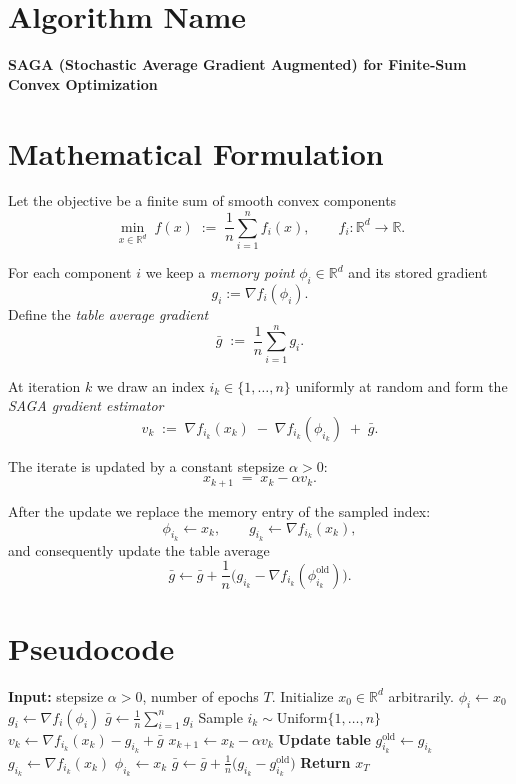 \documentclass{article}
\newcommand{\grad}{\nabla}
\begin{document}
\section*{Algorithm Name}
\textbf{SAGA (Stochastic Average Gradient Augmented) for Finite‑Sum Convex Optimization}

\section*{Mathematical Formulation}
Let the objective be a finite sum of smooth convex components
\[
\min_{x\in\mathbb{R}^d} \; f(x)\;:=\;\frac{1}{n}\sum_{i=1}^{n} f_i(x),
\qquad 
f_i:\mathbb{R}^d\rightarrow\mathbb{R}.
\]

For each component $i$ we keep a \emph{memory point} $\phi_i\in\mathbb{R}^d$ and its stored gradient
\[
g_i := \grad f_i(\phi_i).
\]
Define the \emph{table average gradient}
\[
\bar g \;:=\; \frac{1}{n}\sum_{i=1}^{n} g_i .
\]

At iteration $k$ we draw an index $i_k\in\{1,\dots,n\}$ uniformly at random and form the
\emph{SAGA gradient estimator}
\[
v_k \;:=\; \grad f_{i_k}(x_k) \;-\; \grad f_{i_k}(\phi_{i_k}) \;+\; \bar g .
\tag{1}
\]

The iterate is updated by a constant stepsize $\alpha>0$:
\[
x_{k+1}\;=\;x_k-\alpha v_k .
\tag{2}
\]

After the update we replace the memory entry of the sampled index:
\[
\phi_{i_k}\leftarrow x_k,\qquad
g_{i_k}\leftarrow \grad f_{i_k}(x_k),
\tag{3}
\]
and consequently update the table average
\[
\bar g \leftarrow \bar g +\frac{1}{n}\bigl(g_{i_k}-\grad f_{i_k}(\phi_{i_k}^{\text{old}})\bigr).
\tag{4}
\]

\section*{Pseudocode}
\begin{algorithm}[H]
\caption{SAGA for convex finite‑sum problems}
\begin{algorithmic}[1]
\State \textbf{Input:} stepsize $\alpha>0$, number of epochs $T$.
\State Initialize $x_0\in\mathbb{R}^d$ arbitrarily.
    \State $\phi_i \gets x_0$ 
    \State $g_i \gets \grad f_i(\phi_i)$
\EndFor
\State $\bar g \gets \frac{1}{n}\sum_{i=1}^{n} g_i$ 
    \State Sample $i_k\sim\text{Uniform}\{1,\dots,n\}$
    \State $v_k \gets \grad f_{i_k}(x_k)-g_{i_k}+ \bar g$
    \State $x_{k+1}\gets x_k-\alpha v_k$
    \State \textbf{Update table}
        \State $g_{i_k}^{\text{old}}\gets g_{i_k}$
        \State $g_{i_k}\gets \grad f_{i_k}(x_k)$
        \State $\phi_{i_k}\gets x_k$
        \State $\bar g \gets \bar g + \frac{1}{n}\bigl(g_{i_k}-g_{i_k}^{\text{old}}\bigr)$
\EndFor
\State \textbf{Return} $x_T$
\end{algorithmic}
\end{algorithm}
\end{document}
